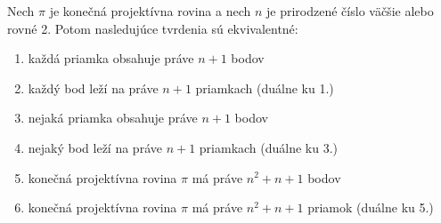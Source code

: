 \begin{theorem}
\label{th:fpp_props}
Nech $\pi$ je konečná projektívna rovina 
a nech $n$ je prirodzené 
číslo väčšie alebo rovné 2. 
Potom nasledujúce tvrdenia sú ekvivalentné:
\begin{enumerate}
    \item každá priamka obsahuje práve $n+1$ bodov
    \item každý bod leží na práve $n+1$ priamkach (duálne ku 1.)
    \item nejaká priamka obsahuje práve $n+1$ bodov
    \item nejaký bod leží na práve $n+1$ priamkach (duálne ku 3.)
    \item konečná projektívna rovina $\pi$ má práve $n^2+n+1$ bodov 
    \item konečná projektívna rovina $\pi$ má práve $n^2+n+1$ priamok (duálne ku 5.)
\end{enumerate}
\end{theorem}
